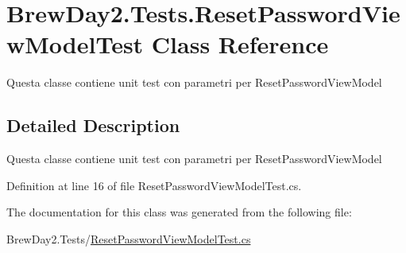 \hypertarget{class_brew_day2_1_1_tests_1_1_reset_password_view_model_test}{}\section{Brew\+Day2.\+Tests.\+Reset\+Password\+View\+Model\+Test Class Reference}
\label{class_brew_day2_1_1_tests_1_1_reset_password_view_model_test}


Questa classe contiene unit test con parametri per Reset\+Password\+View\+Model 




\subsection{Detailed Description}
Questa classe contiene unit test con parametri per Reset\+Password\+View\+Model



Definition at line 16 of file Reset\+Password\+View\+Model\+Test.\+cs.



The documentation for this class was generated from the following file\+:\begin{DoxyCompactItemize}
\item 
Brew\+Day2.\+Tests/\mbox{\hyperlink{_reset_password_view_model_test_8cs}{Reset\+Password\+View\+Model\+Test.\+cs}}\end{DoxyCompactItemize}
